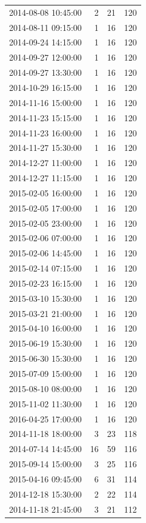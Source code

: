 \begin{tabular}{lrrr}
2014-08-08 10:45:00 & 2 & 21 & 120 \\
2014-08-11 09:15:00 & 1 & 16 & 120 \\
2014-09-24 14:15:00 & 1 & 16 & 120 \\
2014-09-27 12:00:00 & 1 & 16 & 120 \\
2014-09-27 13:30:00 & 1 & 16 & 120 \\
2014-10-29 16:15:00 & 1 & 16 & 120 \\
2014-11-16 15:00:00 & 1 & 16 & 120 \\
2014-11-23 15:15:00 & 1 & 16 & 120 \\
2014-11-23 16:00:00 & 1 & 16 & 120 \\
2014-11-27 15:30:00 & 1 & 16 & 120 \\
2014-12-27 11:00:00 & 1 & 16 & 120 \\
2014-12-27 11:15:00 & 1 & 16 & 120 \\
2015-02-05 16:00:00 & 1 & 16 & 120 \\
2015-02-05 17:00:00 & 1 & 16 & 120 \\
2015-02-05 23:00:00 & 1 & 16 & 120 \\
2015-02-06 07:00:00 & 1 & 16 & 120 \\
2015-02-06 14:45:00 & 1 & 16 & 120 \\
2015-02-14 07:15:00 & 1 & 16 & 120 \\
2015-02-23 16:15:00 & 1 & 16 & 120 \\
2015-03-10 15:30:00 & 1 & 16 & 120 \\
2015-03-21 21:00:00 & 1 & 16 & 120 \\
2015-04-10 16:00:00 & 1 & 16 & 120 \\
2015-06-19 15:30:00 & 1 & 16 & 120 \\
2015-06-30 15:30:00 & 1 & 16 & 120 \\
2015-07-09 15:00:00 & 1 & 16 & 120 \\
2015-08-10 08:00:00 & 1 & 16 & 120 \\
2015-11-02 11:30:00 & 1 & 16 & 120 \\
2016-04-25 17:00:00 & 1 & 16 & 120 \\
2014-11-18 18:00:00 & 3 & 23 & 118 \\
2014-07-14 14:45:00 & 16 & 59 & 116 \\
2015-09-14 15:00:00 & 3 & 25 & 116 \\
2015-04-16 09:45:00 & 6 & 31 & 114 \\
2014-12-18 15:30:00 & 2 & 22 & 114 \\
2014-11-18 21:45:00 & 3 & 21 & 112 \\

\end{tabular}
